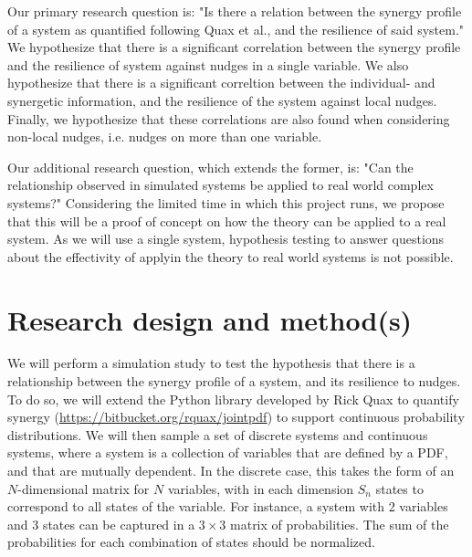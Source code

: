\documentclass[11pt]{article}
\begin{document}
Our primary research question is: "Is there a relation between the synergy profile of a system as quantified following Quax et al., and the resilience of said system." We hypothesize that there is a significant correlation between the synergy profile and the resilience of system against nudges in a single variable. We also hypothesize that there is a significant correltion between the individual- and synergetic information, and the resilience of the system against local nudges. Finally, we hypothesize that these correlations are also found when considering non-local nudges, i.e. nudges on more than one variable.


Our additional research question, which extends the former, is: "Can the relationship observed in simulated systems be applied to real world complex systems?" Considering the limited time in which this project runs, we propose that this will be a proof of concept on how the theory can be applied to a real system. As we will use a single system, hypothesis testing to answer questions about the effectivity of applyin the theory to real world systems is not possible.

\section{Research design and method(s)}

We will perform a simulation study to test the hypothesis that there is a relationship between the synergy profile of a system, and its resilience to nudges. 
To do so, we will extend the Python library developed by Rick Quax to quantify synergy (\url{https://bitbucket.org/rquax/jointpdf}) to support continuous probability distributions.
We will then sample a set of discrete systems and continuous systems, where a system is a collection of variables that are defined by a PDF, and that are mutually dependent.
In the discrete case, this takes the form of an $N$-dimensional matrix for $N$ variables, with in each dimension $S_n$ states to correspond to all states of the variable. 
For instance, a system with 2 variables and 3 states can be captured in a $3\times 3$ matrix of probabilities.
The sum of the probabilities for each combination of states should be normalized.  
\end{document}
